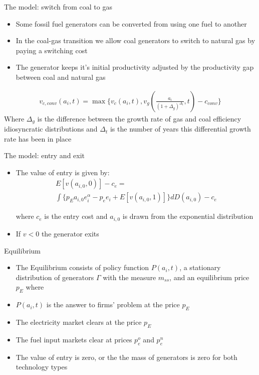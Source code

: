 \documentclass{beamer}
\begin{document}
\begin{frame}{The model: switch from coal to gas}
\begin{itemize}
    \item Some fossil fuel generators can be converted from using one fuel to another
    \item In the coal-gas transition we allow coal generators to switch to natural gas by paying a switching cost
    \item The generator keeps it's initial productivity adjusted by the productivity gap between coal and natural gas
\end{itemize}
\begin{align*}
    v_{c,conv}(a_i,t) = \max \big\{ v_c(a_i,t), v_g(\frac{a_i}{(1+\Delta_g)^{\Delta_t}},t)-c_{conv}\big\}
\end{align*}
Where $\Delta_g$ is the difference between the growth rate of gas and coal efficiency idiosyncratic distributions and $\Delta_t$ is the number of years this differential growth rate has been in place
\end{frame}
\begin{frame}{The model: entry and exit}
\begin{itemize}
    \item The value of entry is given by: 
    \begin{equation*}
    \begin{aligned} 
    E[v(a_{i,0},0)]-c_{e}=\\\int \big\{ p_Ea_{i,0} e_i^\alpha -p_e e_i+E[v(a_{i,0},1)] \big\} dD(a_{i,0})-c_{e}
\end{aligned}
    \end{equation*}
    
where $c_{e}$ is the entry cost and $a_{i,0}$ is drawn from the exponential distribution
\hfill \break
    \item If $v<0$ the generator exits
\end{itemize}
    
\end{frame}
\begin{frame}{Equilibrium}
    \begin{itemize}
        \item The Equilibrium consists of policy function $P(a_i,t)$, a stationary distribution of generators $\Gamma$ with the measure $m_{ss}$, and an equilibrium price $p_E$ where
        \item  $P(a_i,t)$ is the answer to firms' problem at the price $p_E$
        \item The electricity market clears at the price $p_E$ 
        \item The fuel input markets clear at prices $p_e^o$ and $p_e^n$
        \item The value of entry is zero, or the the mass of generators is zero for both technology types
    \end{itemize}
\end{frame}
\end{document}
